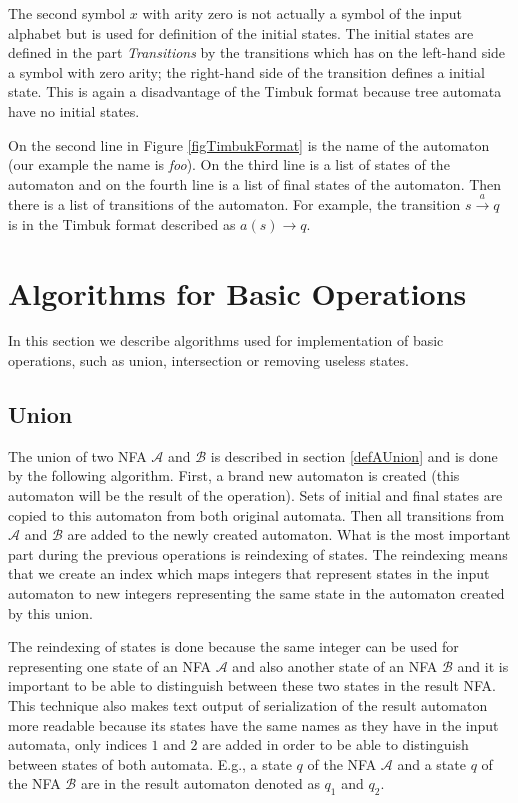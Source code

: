 The second symbol $x$ with arity zero is not actually a symbol of the input alphabet but is used for definition of the initial states. The
initial states are defined in the part \emph{Transitions} by the transitions which has on the left-hand side a symbol with zero arity; the
right-hand side of the transition defines a initial state. This is again a disadvantage
of the Timbuk format because tree automata have no initial states.

On the second line in Figure \ref{figTimbukFormat} is the name of the automaton (our example the name is \emph{foo}). 
On the third line is a list of states of the automaton and on the fourth line is a list of final states of the automaton.
Then there is a list of transitions of the automaton. 
For example, the transition $s \xrightarrow{a} q$ is in the Timbuk format described as $a(s)\rightarrow q$.

\section{Algorithms for Basic Operations}
In this section we describe algorithms used for implementation of basic operations, such as union, intersection or removing useless states. 

\subsection{Union}
The union of two NFA $\mathcal{A}$ and $\mathcal{B}$ is described in section \ref{defAUnion} and
is done by the following algorithm. First, a brand new automaton is created (this automaton
will be the result of the operation). 
Sets of initial and final states are copied to this automaton from both original automata. Then all transitions from $\mathcal{A}$ and
$\mathcal{B}$ are added to the newly created automaton. What is the most important part during the previous operations is reindexing of states. 
The reindexing means that we create an index which maps
integers that represent states in the input automaton to new integers representing the same state in the automaton created by this union.

The reindexing of states is done because the same integer can be used for representing one state of an NFA $\mathcal{A}$ 
and also another state of an NFA $\mathcal{B}$ and it is important
to be able to distinguish between these two states in the result NFA. This technique also makes text output of serialization of the result automaton 
more readable because its states have the same names as they have in the input automata, only indices $1$ and $2$ are added in order to be able to 
distinguish between states of both automata. E.g., a state $q$ of the NFA $\mathcal{A}$ and a state $q$ of the 
NFA $\mathcal{B}$ are in the result automaton denoted as $q_1$ and $q_2$.

